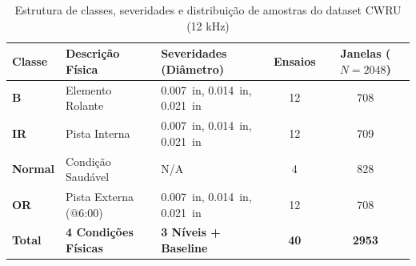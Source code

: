 \begin{table}[htbp]
    \centering
    \caption{Estrutura de classes, severidades e distribuição de amostras do dataset CWRU (12 kHz)}
    \label{tab:dataset_classes}
    \begin{tabular}{lllcc}
        \toprule
        \textbf{Classe} & \textbf{Descrição Física} & \textbf{Severidades (Diâmetro)} & \textbf{Ensaios} & \textbf{Janelas ($N=2048$)} \\
        \midrule
        \textbf{B} & Elemento Rolante & \SI{0.007}{in}, \SI{0.014}{in}, \SI{0.021}{in} & \num{12} & \num{708} \\
        \textbf{IR} & Pista Interna & \SI{0.007}{in}, \SI{0.014}{in}, \SI{0.021}{in} & \num{12} & \num{709} \\
        \textbf{Normal} & Condição Saudável & N/A & \num{4} & \num{828} \\
        \textbf{OR} & Pista Externa (@6:00) & \SI{0.007}{in}, \SI{0.014}{in}, \SI{0.021}{in} & \num{12} & \num{708} \\
        \midrule
        \textbf{Total} & \textbf{4 Condições Físicas} & \textbf{3 Níveis + Baseline} & \textbf{\num{40}} & \textbf{\num{2953}} \\
        \bottomrule
    \end{tabular}
\end{table}

